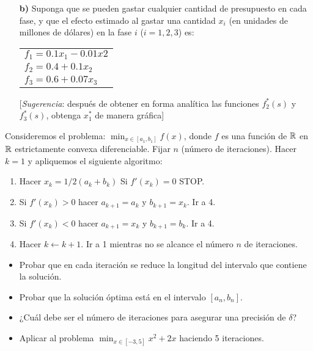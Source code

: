 \documentclass[twoside]{article}
\begin{document}
\begin{ejercicio}{1}
\begin{itemize}
\item[\textbf{b)}] Suponga que se pueden gastar cualquier cantidad de presupuesto en cada fase, y que el efecto estimado al gastar una cantidad $x_i$ (en unidades de millones de dólares) en la fase $i$ ($i=1,2,3$) es:

\begin{tabular}{l}
$f_1=0.1x_1-0.01x2$\\
$f_2=0.4+0.1x_2$\\
$f_3=0.6+0.07x_3$
\end{tabular}

[\emph{Sugerencia}: después de obtener en forma analítica las funciones $f_2^*(s)$ y $f_3^*(s)$, obtenga $x_1^*$ de manera gráfica]
\end{itemize}
\end{ejercicio}
\begin{solucion}


\end{solucion}

\newpage

\begin{ejercicio}{2}
Consideremos el problema: $\min_{x\in[a_1,b_1]}f(x)$, donde $f$ es una función de $\mathbb{R}$ en $\mathbb{R}$ estrictamente convexa diferenciable. Fijar $n$ (número de iteraciones). Hacer $k=1$ y apliquemos el siguiente algoritmo:
\begin{enumerate}
\item Hacer $x_k=1/2(a_k+b_k)$ Si $f'(x_k)=0$ STOP.
\item Si $f'(x_k)>0$ hacer $a_{k+1}=a_k$ y $b_{k+1}=x_k$. Ir a 4.
\item Si $f'(x_k)<0$ hacer $a_{k+1}=x_k$ y $b_{k+1}=b_k$. Ir a 4. 
\item Hacer $k\leftarrow k+1$. Ir a 1 mientras no se alcance el número $n$ de iteraciones.
\end{enumerate}
\begin{itemize}
\item Probar que en cada iteración se reduce la longitud del intervalo que contiene la solución.
\item Probar que la solución óptima está en el intervalo $[a_n,b_n]$. 
\item ¿Cuál debe ser el número de iteraciones para asegurar una precisión de $\delta$?
\item Aplicar al problema $\min_{x\in[-3,5]}x^2+2x$ haciendo 5 iteraciones.
\end{itemize}
\end{ejercicio}
\begin{solucion}


\end{solucion}
\end{document}
